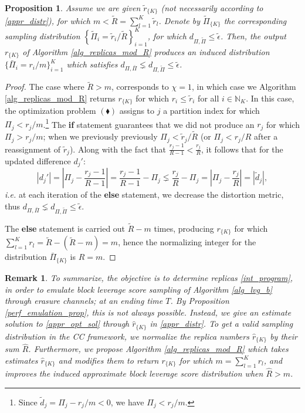 \documentclass[journal,letterpaper,onecolumn,twoside,nofonttune]{IEEEtran}
\newcommand{\N}{\mathbb{N}}
\newcommand{\dt}{\tilde{d}}
\newcommand{\Rh}{\hat{R}}
\newcommand{\Rt}{\tilde{R}}
\newcommand{\rh}{\hat{r}}
\newcommand{\rt}{\tilde{r}}
\newcommand{\Pib}{\bar{\Pi}}
\newcommand{\Pit}{\tilde{\Pi}}
\newtheorem{Prop}{Proposition}
\newtheorem{Rmk}{Remark}
\begin{document}
\begin{Prop}
\label{prop_reduct_alg}  %
Assume we are given $\rt_{\{K\}}$ (not necessarily according to \eqref{appr_distr}), for which $m<\Rt=\sum_{l=1}^K\rt_l$. Denote by $\Pit_{\{K\}}$ the corresponding sampling distribution $\left\{\Pit_i=\rt_i/\Rt\right\}_{i=1}^K$, for which $d_{\Pi,\Pit}\leqslant\tilde{\epsilon}$. Then, the output $r_{\{K\}}$ of Algorithm \ref{alg_replicas_mod_R} produces an induced distribution $\{\Pib_i=r_i/m\}_{i=1}^K$ which satisfies $d_{\Pi,\Pib}\lneq d_{\Pi,\Pit}\leqslant\tilde{\epsilon}$.
\end{Prop}

\begin{proof}
The case where $\Rt>m$, corresponds to $\chi=1$, in which case we Algorithm \ref{alg_replicas_mod_R} returns $r_{\{K\}}$ for which $r_i\leqslant\rt_i$ for all $i\in\N_K$. In this case, the optimization problem $(\blacklozenge)$ assigns to $j$ a partition index for which $\Pi_j<r_j/m$.\footnote{Since $\dt_j=\Pi_j-r_j/m<0$, we have $\Pi_j<r_j/m$.} The \textbf{if} statement guarantees that we did not produce an $r_j$ for which $\Pi_j>r_j/m$; when we previously previously $\Pi_j<\rt_j/\Rt$ (or $\Pi_j<r_j/R$ after a reassignment of $\rt_j$). Along with the fact that $\frac{r_j-1}{R-1}<\frac{r_j}{R}$, it follows that for the updated difference $d_j'$:
\begin{equation*}
  \left|d_j'\right| = \left|\Pi_j-\frac{r_j-1}{R-1}\right| = \frac{r_j-1}{R-1}-\Pi_j \lneq \frac{r_j}{R}-\Pi_j = \left|\Pi_j-\frac{r_j}{R}\right| = \left|\dt_j\right|,
\end{equation*}
\textit{i.e.} at each iteration of the \textbf{else} statement, we decrease the distortion metric, thus $d_{\Pi,\Pib}\lneq d_{\Pi,\Pit}\leqslant\tilde{\epsilon}$.

The \textbf{else} statement is carried out $\Rt-m$ times, producing $r_{\{K\}}$ for which $\sum_{l=1}^Kr_l=\Rt-(\Rt-m)=m$, hence the normalizing integer for the distribution $\Pib_{\{K\}}$ is $R=m$.
\end{proof}

\begin{Rmk}
\label{summary_approach}
To summarize, the objective is to determine replicas \eqref{int_program}, in order to emulate block leverage score sampling of Algorithm \ref{alg_lvg_b} through erasure channels; at an ending time $T$. By Proposition \ref{perf_emulation_prop}, this is not always possible. Instead, we give an estimate solution to \eqref{appr_opt_sol} through $\rh_{\{K\}}$ in \eqref{appr_distr}. To get a valid sampling distribution in the CC framework, we normalize the replica numbers $\rh_{\{K\}}$ by their sum $\Rh$. Furthermore, we propose Algorithm \ref{alg_replicas_mod_R} which takes estimates $\rh_{\{K\}}$ and modifies them to return $r_{\{K\}}$ for which $m=\sum_{l=1}^Kr_l$, and improves the induced approximate block leverage score distribution when $\Rh>m$.
\end{Rmk}
\end{document}
